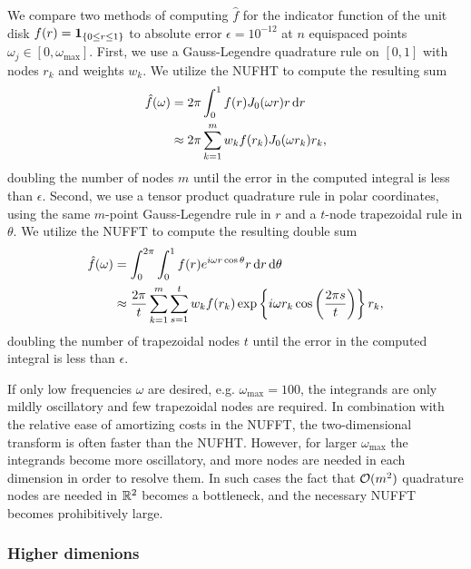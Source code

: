 We compare two methods of computing $\hat{f}$ for the indicator function of the
unit disk $f(r) = \bm{1}_{\left\{ 0 \leq r \leq 1\right\}}$ to absolute error $\epsilon = 10^{-12}$
at $n$ equispaced points $\omega_j \in [0, \omega_{\text{max}}]$. First, we use
a Gauss-Legendre quadrature rule on $[0,1]$ with nodes $r_k$ and weights $w_k$.
We utilize the NUFHT to compute the resulting sum
\begin{align}
  \hat{f}(\omega) 
  &= 2\pi\int_0^1 f(r) J_0(\omega r) r \mathop{}\!\mathrm{d}{r} \\
  &\approx 2\pi \sum_{k=1}^m w_k f(r_k) J_0(\omega r_k) r_k,
\end{align}
doubling the number of nodes $m$ until the error in the computed integral is
less than $\epsilon$. Second, we use a tensor product quadrature rule in polar
coordinates, using the same $m$-point Gauss-Legendre rule in $r$ and a $t$-node
trapezoidal rule in $\theta$. We utilize the NUFFT to compute the resulting
double sum
\begin{align}
  \hat{f}(\omega) 
  &= \int_0^{2\pi} \int_0^1 f(r) e^{i\omega r\cos\theta} r \mathop{}\!\mathrm{d}{r} \mathop{}\!\mathrm{d}{\theta} \\
  &\approx \frac{2\pi}{t} \sum_{k=1}^{m} \sum_{s=1}^{t} w_k f(r_k) \exp\left\{i\omega r_k\cos\left(\frac{2\pi s}{t}\right)\right\} r_k,
\end{align}
doubling the number of trapezoidal nodes $t$ until the error in the computed
integral is less than $\epsilon$.

If only low frequencies $\omega$ are desired, e.g. $\omega_{\text{max}} = 100$,
the integrands are only mildly oscillatory and few trapezoidal nodes are
required. In combination with the relative ease of amortizing costs in the
NUFFT, the two-dimensional transform is often faster than the NUFHT. However,
for larger $\omega_{\text{max}}$ the integrands become more oscillatory, and
more nodes are needed in each dimension in order to resolve them. In such cases
the fact that $\mathcal{O}(m^2)$ quadrature nodes are needed in $\mathbb{R}^2$ becomes a
bottleneck, and the necessary NUFFT becomes prohibitively large. 


\subsubsection{Higher dimenions}

